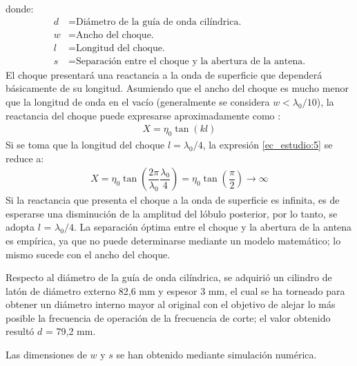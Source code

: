 donde:
\begin{align*}
d &= \text{Diámetro de la guía de onda cilíndrica.}\\
w &= \text{Ancho del choque.}\\
l &= \text{Longitud del choque.}\\
s &= \text{Separación entre el choque y la abertura de la antena.}
\end{align*}
El choque presentará una reactancia a la onda de superficie que dependerá básicamente de su longitud. Asumiendo que el ancho del choque es mucho menor que la longitud de onda en el vacío (generalmente se considera $w < \lambda_0/10$), la reactancia del choque puede expresarse aproximadamente como \cite{Elliott}:
\begin{align}
X = \eta_0\tan\left(kl\right)
\label{ec_estudio:5}
\end{align}
Si se toma que la longitud del choque $l = \lambda_0/4$, la expresión \eqref{ec_estudio:5} se reduce a:
\begin{align}
X = \eta_0\tan\left(\dfrac{2\pi}{ \lambda_0}\dfrac{\lambda_0}{4}\right) = \eta_0\tan\left(\dfrac{\pi}{2}\right)\longrightarrow\infty
\label{ec_estudio:6}
\end{align}
Si la reactancia que presenta el choque a la onda de superficie es infinita, es de esperarse una disminución de la amplitud del lóbulo posterior, por lo tanto, se adopta $l$ = $\lambda_0/4$. La separación óptima entre el choque y la abertura de la antena es empírica, ya que no puede determinarse mediante un modelo matemático; lo mismo sucede con el ancho del choque.

Respecto al diámetro de la guía de onda cilíndrica, se adquirió un cilindro de latón de diámetro externo 82,6 mm y espesor 3 mm, el cual se ha torneado para obtener un diámetro interno mayor al original con el objetivo de alejar lo más posible la frecuencia de operación de la frecuencia de corte; el valor obtenido resultó $d$ = 79,2 mm.

Las dimensiones de $w$ y $s$ se han obtenido mediante simulación numérica.

